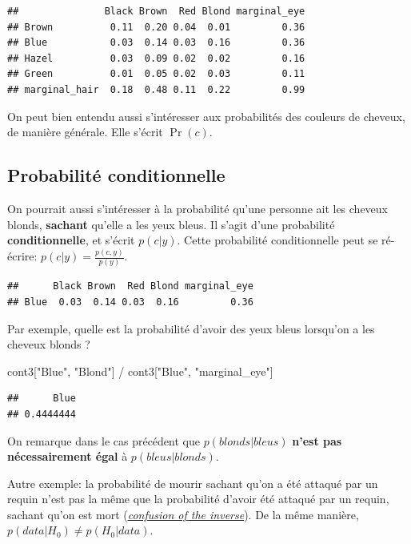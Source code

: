 \documentclass[
  a4paper,11pt,twoside,onecolumn,openright,final,oldfontcommands]{memoir}
\newenvironment{Shaded}{\begin{snugshade}}{\end{snugshade}}
\newcommand{\NormalTok}[1]{#1}
\newcommand{\SpecialCharTok}[1]{\textcolor[rgb]{0.00,0.00,0.00}{#1}}
\newcommand{\StringTok}[1]{\textcolor[rgb]{0.31,0.60,0.02}{#1}}
\theoremstyle{definition}
\theoremstyle{definition}
\theoremstyle{definition}
\theoremstyle{definition}
\theoremstyle{remark}
\begin{document}
\begin{verbatim}
##               Black Brown  Red Blond marginal_eye
## Brown          0.11  0.20 0.04  0.01         0.36
## Blue           0.03  0.14 0.03  0.16         0.36
## Hazel          0.03  0.09 0.02  0.02         0.16
## Green          0.01  0.05 0.02  0.03         0.11
## marginal_hair  0.18  0.48 0.11  0.22         0.99
\end{verbatim}

On peut bien entendu aussi s'intéresser aux probabilités des couleurs de cheveux, de manière générale. Elle s'écrit \(\Pr(c)\).

\hypertarget{probabilituxe9-conditionnelle}{%
\subsection{Probabilité conditionnelle}\label{probabilituxe9-conditionnelle}}

On pourrait aussi s'intéresser à la probabilité qu'une personne ait les cheveux blonds, \textbf{sachant} qu'elle a les yeux bleus. Il s'agit d'une probabilité \textbf{conditionnelle}, et s'écrit \(p(c|y)\). Cette probabilité conditionnelle peut se ré-écrire: \(p(c|y)= \frac{p(c,y)}{p(y)}\).

\begin{verbatim}
##      Black Brown  Red Blond marginal_eye
## Blue  0.03  0.14 0.03  0.16         0.36
\end{verbatim}

Par exemple, quelle est la probabilité d'avoir des yeux bleus lorsqu'on a les cheveux blonds ?

\begin{Shaded}
\begin{Highlighting}[]
\NormalTok{cont3[}\StringTok{"Blue"}\NormalTok{, }\StringTok{"Blond"}\NormalTok{] }\SpecialCharTok{/}\NormalTok{ cont3[}\StringTok{"Blue"}\NormalTok{, }\StringTok{"marginal\_eye"}\NormalTok{]  }
\end{Highlighting}
\end{Shaded}

\begin{verbatim}
##      Blue 
## 0.4444444
\end{verbatim}

On remarque dans le cas précédent que \(p(blonds|bleus)\) \textbf{n'est pas nécessairement égal} à \(p(bleus|blonds)\).

Autre exemple: la probabilité de mourir sachant qu'on a été attaqué par un requin n'est pas la même que la probabilité d'avoir été attaqué par un requin, sachant qu'on est mort (\href{https://en.wikipedia.org/wiki/Confusion_of_the_inverse}{\emph{confusion of the inverse}}). De la même manière, \(p(data|H_{0}) \neq p(H_{0}|data)\).
\end{document}
